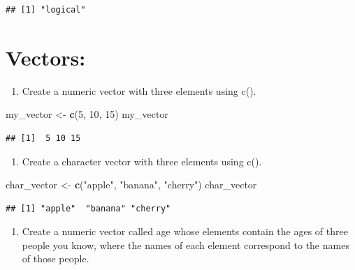 \documentclass[
]{article}
\newenvironment{Shaded}{\begin{snugshade}}{\end{snugshade}}
\newcommand{\DecValTok}[1]{\textcolor[rgb]{0.00,0.00,0.81}{#1}}
\newcommand{\FunctionTok}[1]{\textcolor[rgb]{0.13,0.29,0.53}{\textbf{#1}}}
\newcommand{\NormalTok}[1]{#1}
\newcommand{\OtherTok}[1]{\textcolor[rgb]{0.56,0.35,0.01}{#1}}
\newcommand{\StringTok}[1]{\textcolor[rgb]{0.31,0.60,0.02}{#1}}
\providecommand{\tightlist}{%
  \setlength{\itemsep}{0pt}\setlength{\parskip}{0pt}}
\begin{document}
\begin{verbatim}
## [1] "logical"
\end{verbatim}

\section{Vectors:}\label{vectors}

\begin{enumerate}
\def\labelenumi{\arabic{enumi}.}
\setcounter{enumi}{6}
\tightlist
\item
  Create a numeric vector with three elements using c().
\end{enumerate}

\begin{Shaded}
\begin{Highlighting}[]
\NormalTok{my\_vector }\OtherTok{\textless{}{-}} \FunctionTok{c}\NormalTok{(}\DecValTok{5}\NormalTok{, }\DecValTok{10}\NormalTok{, }\DecValTok{15}\NormalTok{)}
\NormalTok{my\_vector}
\end{Highlighting}
\end{Shaded}

\begin{verbatim}
## [1]  5 10 15
\end{verbatim}

\begin{enumerate}
\def\labelenumi{\arabic{enumi}.}
\setcounter{enumi}{7}
\tightlist
\item
  Create a character vector with three elements using c().
\end{enumerate}

\begin{Shaded}
\begin{Highlighting}[]
\NormalTok{char\_vector }\OtherTok{\textless{}{-}} \FunctionTok{c}\NormalTok{(}\StringTok{"apple"}\NormalTok{, }\StringTok{"banana"}\NormalTok{, }\StringTok{"cherry"}\NormalTok{)}
\NormalTok{char\_vector}
\end{Highlighting}
\end{Shaded}

\begin{verbatim}
## [1] "apple"  "banana" "cherry"
\end{verbatim}

\begin{enumerate}
\def\labelenumi{\arabic{enumi}.}
\setcounter{enumi}{8}
\tightlist
\item
  Create a numeric vector called age whose elements contain the ages of
  three people you know, where the names of each element correspond to
  the names of those people.
\end{enumerate}
\end{document}
